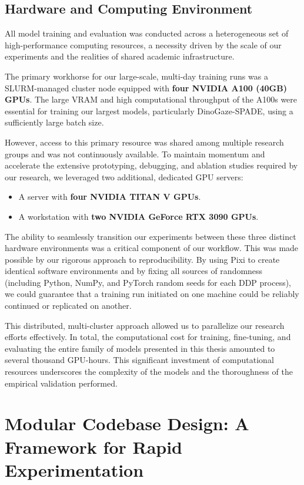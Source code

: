 \subsection{Hardware and Computing Environment}
All model training and evaluation was conducted across a heterogeneous set of high-performance computing resources, a necessity driven by the scale of our experiments and the realities of shared academic infrastructure.

The primary workhorse for our large-scale, multi-day training runs was a SLURM-managed cluster node equipped with \textbf{four NVIDIA A100 (40GB) GPUs}. The large VRAM and high computational throughput of the A100s were essential for training our largest models, particularly DinoGaze-SPADE, using a sufficiently large batch size.

However, access to this primary resource was shared among multiple research groups and was not continuously available. To maintain momentum and accelerate the extensive prototyping, debugging, and ablation studies required by our research, we leveraged two additional, dedicated GPU servers:
\begin{itemize}
    \item A server with \textbf{four NVIDIA TITAN V GPUs}.
    \item A workstation with \textbf{two NVIDIA GeForce RTX 3090 GPUs}.
\end{itemize}

The ability to seamlessly transition our experiments between these three distinct hardware environments was a critical component of our workflow. This was made possible by our rigorous approach to reproducibility. By using Pixi to create identical software environments and by fixing all sources of randomness (including Python, NumPy, and PyTorch random seeds for each DDP process), we could guarantee that a training run initiated on one machine could be reliably continued or replicated on another.

This distributed, multi-cluster approach allowed us to parallelize our research efforts effectively. In total, the computational cost for training, fine-tuning, and evaluating the entire family of models presented in this thesis amounted to several thousand GPU-hours. This significant investment of computational resources underscores the complexity of the models and the thoroughness of the empirical validation performed.




\section[Modular Experimentation Framework]{Modular Codebase Design: A Framework for Rapid Experimentation}
\label{sec:impl_modular_design}

